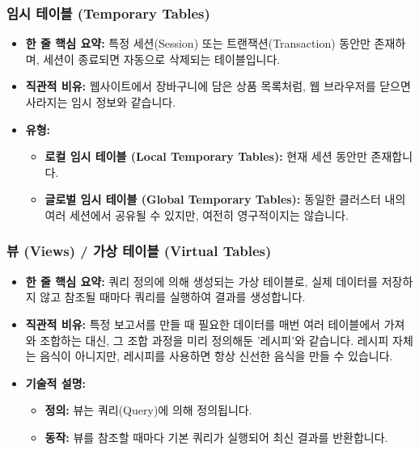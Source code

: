 \documentclass[11pt,a4paper]{article}
\begin{document}
\subsubsection{임시 테이블 (Temporary Tables)}
\begin{itemize}
    \item \textbf{한 줄 핵심 요약:} 특정 세션(Session) 또는 트랜잭션(Transaction) 동안만 존재하며, 세션이 종료되면 자동으로 삭제되는 테이블입니다.
    \item \textbf{직관적 비유:} 웹사이트에서 장바구니에 담은 상품 목록처럼, 웹 브라우저를 닫으면 사라지는 임시 정보와 같습니다.
    \item \textbf{유형:}
    \begin{itemize}
        \item \textbf{로컬 임시 테이블 (Local Temporary Tables):} 현재 세션 동안만 존재합니다.
        \item \textbf{글로벌 임시 테이블 (Global Temporary Tables):} 동일한 클러스터 내의 여러 세션에서 공유될 수 있지만, 여전히 영구적이지는 않습니다.
    \end{itemize}
\end{itemize}

\subsubsection{뷰 (Views) / 가상 테이블 (Virtual Tables)}
\begin{itemize}
    \item \textbf{한 줄 핵심 요약:} 쿼리 정의에 의해 생성되는 가상 테이블로, 실제 데이터를 저장하지 않고 참조될 때마다 쿼리를 실행하여 결과를 생성합니다.
    \item \textbf{직관적 비유:} 특정 보고서를 만들 때 필요한 데이터를 매번 여러 테이블에서 가져와 조합하는 대신, 그 조합 과정을 미리 정의해둔 '레시피'와 같습니다. 레시피 자체는 음식이 아니지만, 레시피를 사용하면 항상 신선한 음식을 만들 수 있습니다.
    \item \textbf{기술적 설명:}
    \begin{itemize}
        \item \textbf{정의:} 뷰는 쿼리(Query)에 의해 정의됩니다.
        \item \textbf{동작:} 뷰를 참조할 때마다 기본 쿼리가 실행되어 최신 결과를 반환합니다.
    \end{itemize}
\end{itemize}
\end{document}
